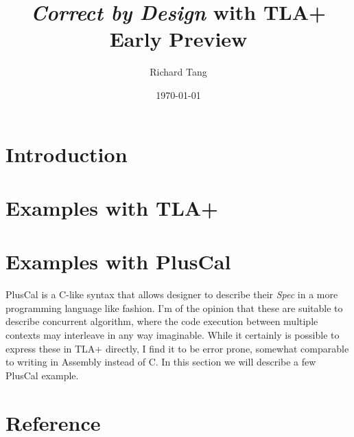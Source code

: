 \documentclass{kdp}
\title{\textit{Correct by Design} with TLA+ \\ Early Preview}
\author{Richard Tang}
\date{\today}
\begin{document}
\maketitle


\tableofcontents

\part{Introduction}





\part{Examples with TLA+}

% 









\part{Examples with PlusCal}

PlusCal is a C-like syntax that allows designer to describe their \textit{Spec}
in a more programming language like fashion. I'm of the opinion that these are
suitable to describe concurrent algorithm, where the code execution between
multiple contexts may interleave in any way imaginable. While it certainly is
possible to express these in TLA+ directly, I find it to be error prone,
somewhat comparable to writing in Assembly instead of C. In this section we will
describe a few PlusCal example.





\part{Reference}










\end{document}
